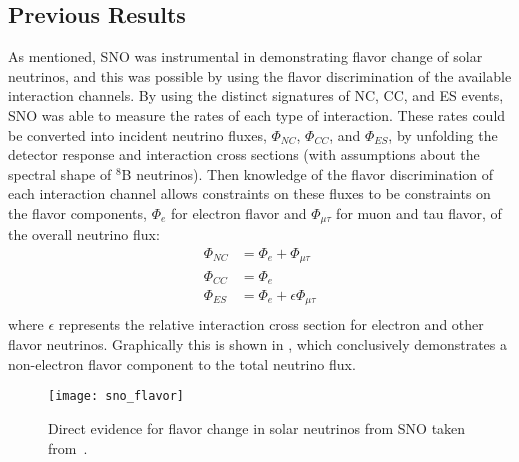 \subsection{Previous Results}

As mentioned, SNO was instrumental in demonstrating flavor change of solar neutrinos, and this was possible by using the flavor discrimination of the available interaction channels.
By using the distinct signatures of NC, CC, and ES events, SNO was able to measure the rates of each type of interaction.
These rates could be converted into incident neutrino fluxes, $\Phi_{NC}$, $\Phi_{CC}$, and $\Phi_{ES}$, by unfolding the detector response and interaction cross sections (with assumptions about the spectral shape of $^8$B neutrinos).
Then knowledge of the flavor discrimination of each interaction channel allows constraints on these fluxes to be constraints on the flavor components, $\Phi_e$ for electron flavor and $\Phi_{\mu\tau}$ for muon and tau flavor, of the overall neutrino flux:
\begin{equation}
\begin{split}
\Phi_{NC} &= \Phi_{e} + \Phi_{\mu\tau} \\
\Phi_{CC} &= \Phi_{e} \\
\Phi_{ES} &= \Phi_{e} + \epsilon \Phi_{\mu\tau} \\
\end{split}
\end{equation}
where $\epsilon$ represents the relative interaction cross section for electron and other flavor neutrinos.
Graphically this is shown in , which conclusively demonstrates a non-electron flavor component to the total neutrino flux.

\begin{figure}
\centering
\texttt{[image: sno\_flavor]}
\caption{\label{fig:sno_flavor} Direct evidence for flavor change in solar neutrinos from SNO taken from~\cite{sno_direct}.}
\end{figure}

